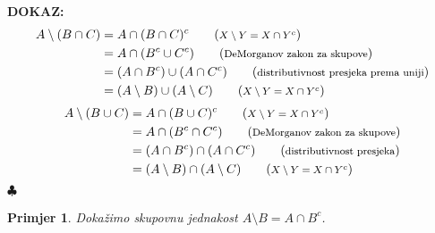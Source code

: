 \documentclass{article}
\newtheorem{primjer}{Primjer}
\newenvironment{dokaz}
    {\noindent\textbf{DOKAZ:}\\} {\hfill $\clubsuit$}
\begin{document}
\begin{dokaz}
    \begin{align*}
        A\setminus (B\cap C)    &= A\cap (B\cap C)^c                    \tag{\textrm{\footnotesize $X\setminus Y=X\cap Y^c$}}\\
                                &= A\cap (B^c\cup C^c)                  \tag{\textrm{\footnotesize DeMorganov zakon za skupove}}\\
                                &= (A\cap B^c)\cup (A\cap C^c)          \tag{\textrm{\footnotesize distributivnost presjeka prema uniji}}\\
                                &= (A\setminus B)\cup (A\setminus C)    \tag{\textrm{\footnotesize $X\setminus Y=X\cap Y^c$}}\\
    \end{align*}
    \begin{align*}
        A\setminus (B\cup C)    &= A\cap (B\cup C)^c                    \tag{\textrm{\footnotesize $X\setminus Y=X\cap Y^c$}}\\
                                &= A\cap (B^c\cap C^c)                  \tag{\textrm{\footnotesize DeMorganov zakon za skupove}}\\
                                &= (A\cap B^c)\cap (A\cap C^c)          \tag{\textrm{\footnotesize distributivnost presjeka}}\\
                                &= (A\setminus B)\cap (A\setminus C)    \tag{\textrm{\footnotesize $X\setminus Y=X\cap Y^c$}}\\
    \end{align*}
\end{dokaz}

\newpage
\begin{primjer}
    Dokažimo skupovnu jednakost $A\setminus B=A\cap B^c$.
\end{primjer}
\end{document}
